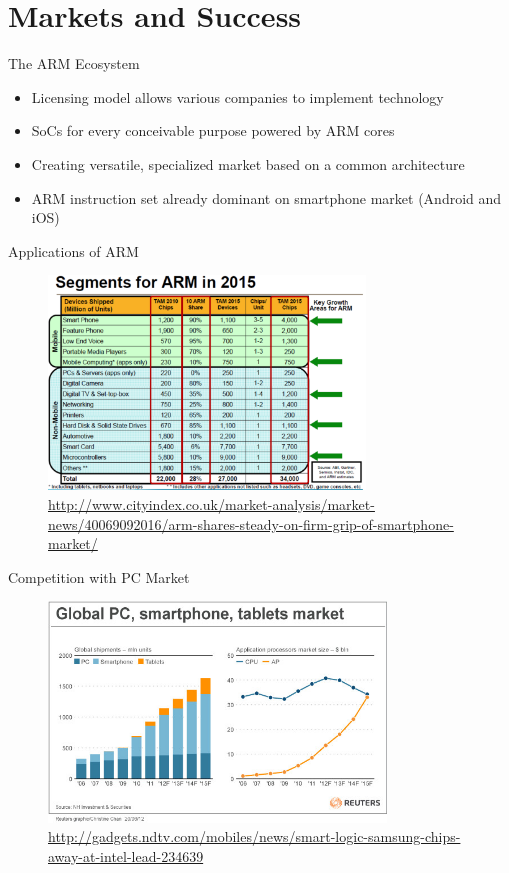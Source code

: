 \documentclass{beamer}
\begin{document}
\section{Markets and Success}

\begin{frame}[t]{The ARM Ecosystem}
    \begin{itemize}
        \item Licensing model allows various companies to implement technology
        \item SoCs for every conceivable purpose powered by ARM cores
        \item Creating versatile, specialized market based on a common architecture
        \item ARM instruction set already dominant on smartphone market (Android and iOS)
    \end{itemize}
\end{frame}

\begin{frame}{Applications of ARM}
\begin{figure}
    \includegraphics[width=0.75\textwidth]{arm2015_new.pdf}
    \caption{\url{http://www.cityindex.co.uk/market-analysis/market-news/40069092016/arm-shares-steady-on-firm-grip-of-smartphone-market/}}
\end{figure}
\end{frame}

\begin{frame}{Competition with PC Market}
 \begin{center}
 \begin{figure}
  \includegraphics[width=0.8\textwidth]{procshare.jpg}
  \caption{\url{http://gadgets.ndtv.com/mobiles/news/smart-logic-samsung-chips-away-at-intel-lead-234639}}
 \end{figure}
\end{center}
\end{frame}
\end{document}
